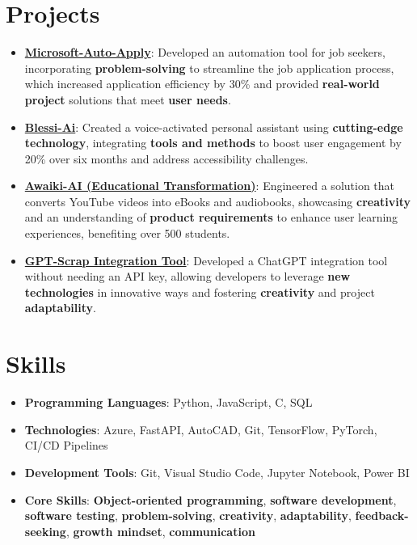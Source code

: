 \documentclass[letterpaper,11pt]{article}
\newcommand{\resumeItem}[2]{
  \item\small{
    \textbf{#1}{: #2 \vspace{-2pt}}
  }
}
\newcommand{\resumeSubItem}[2]{\resumeItem{#1}{#2}\vspace{-4pt}}
\newcommand{\resumeSubHeadingListStart}{\begin{itemize}[leftmargin=*]}
\newcommand{\resumeSubHeadingListEnd}{\end{itemize}}
\begin{document}
\section{Projects}
  \resumeSubHeadingListStart
    \resumeSubItem{\href{https://github.com/kashifalikhan36/MIcrosoft_autoearly_apply}{Microsoft-Auto-Apply}}
      {Developed an automation tool for job seekers, incorporating \textbf{problem-solving} to streamline the job application process, which increased application efficiency by 30\% and provided \textbf{real-world project} solutions that meet \textbf{user needs}.}
      
    \resumeSubItem{\href{https://youtu.be/OyDJ7AkI3zU}{Blessi-Ai}}
      {Created a voice-activated personal assistant using \textbf{cutting-edge technology}, integrating \textbf{tools and methods} to boost user engagement by 20\% over six months and address accessibility challenges.}
      
    \resumeSubItem{\href{https://youtu.be/9uK548bL858}{Awaiki-AI (Educational Transformation)}}
      {Engineered a solution that converts YouTube videos into eBooks and audiobooks, showcasing \textbf{creativity} and an understanding of \textbf{product requirements} to enhance user learning experiences, benefiting over 500 students.}
    \resumeSubItem{\href{https://github.com/kashifalikhan36/Gpt-Scrap}{GPT-Scrap Integration Tool}}
      {Developed a ChatGPT integration tool without needing an API key, allowing developers to leverage \textbf{new technologies} in innovative ways and fostering \textbf{creativity} and project \textbf{adaptability}.}
  \resumeSubHeadingListEnd

\section{Skills}
 \resumeSubHeadingListStart
   \item \textbf{Programming Languages}: Python, JavaScript, C, SQL
   \item \textbf{Technologies}: Azure, FastAPI, AutoCAD, Git, TensorFlow, PyTorch, CI/CD Pipelines
   \item \textbf{Development Tools}: Git, Visual Studio Code, Jupyter Notebook, Power BI
   \item \textbf{Core Skills}: \textbf{Object-oriented programming}, \textbf{software development}, \textbf{software testing}, \textbf{problem-solving}, \textbf{creativity}, \textbf{adaptability}, \textbf{feedback-seeking}, \textbf{growth mindset}, \textbf{communication}
 \resumeSubHeadingListEnd
\end{document}
